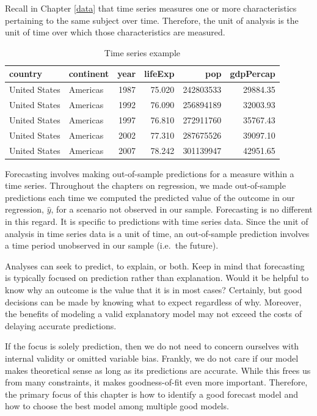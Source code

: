 \documentclass[
]{book}
\begin{document}
Recall in Chapter \ref{data} that time series measures one or more characteristics pertaining to the same subject over time. Therefore, the unit of analysis is the unit of time over which those characteristics are measured.

\begin{table}

\caption{\label{tab:timeseriesrep}Time series example}
\centering
\begin{tabular}[t]{l|l|r|r|r|r}
\hline
country & continent & year & lifeExp & pop & gdpPercap\\
\hline
United States & Americas & 1987 & 75.020 & 242803533 & 29884.35\\
\hline
United States & Americas & 1992 & 76.090 & 256894189 & 32003.93\\
\hline
United States & Americas & 1997 & 76.810 & 272911760 & 35767.43\\
\hline
United States & Americas & 2002 & 77.310 & 287675526 & 39097.10\\
\hline
United States & Americas & 2007 & 78.242 & 301139947 & 42951.65\\
\hline
\end{tabular}
\end{table}

Forecasting involves making out-of-sample predictions for a measure within a time series. Throughout the chapters on regression, we made out-of-sample predictions each time we computed the predicted value of the outcome in our regression, \(\hat{y}\), for a scenario not observed in our sample. Forecasting is no different in this regard. It is specific to predictions with time series data. Since the unit of analysis in time series data is a unit of time, an out-of-sample prediction involves a time period unobserved in our sample (i.e.~the future).

Analyses can seek to predict, to explain, or both. Keep in mind that forecasting is typically focused on prediction rather than explanation. Would it be helpful to know why an outcome is the value that it is in most cases? Certainly, but good decisions can be made by knowing what to expect regardless of why. Moreover, the benefits of modeling a valid explanatory model may not exceed the costs of delaying accurate predictions.

If the focus is solely prediction, then we do not need to concern ourselves with internal validity or omitted variable bias. Frankly, we do not care if our model makes theoretical sense as long as its predictions are accurate. While this frees us from many constraints, it makes goodness-of-fit even more important. Therefore, the primary focus of this chapter is how to identify a good forecast model and how to choose the best model among multiple good models.
\end{document}
